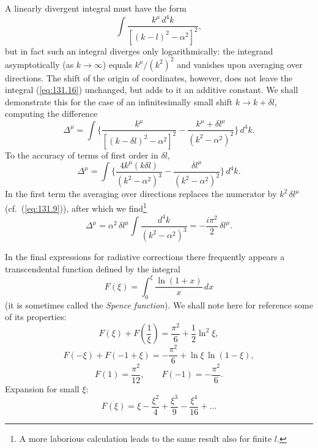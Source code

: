 A linearly divergent integral must have the form
\begin{equation}
\int \frac{k^\mu\,d^4k}{[(k-l)^2 - \alpha^2]^2},
\label{eq:131.16}
\end{equation}
but in fact such an integral diverges only logarithmically: the integrand asymptotically (as $k \to \infty$) equals $k^\mu/(k^2)^2$ and vanishes upon averaging over directions. The shift of the origin of coordinates, however, does not leave the integral (\ref{eq:131.16}) unchanged, but adds to it an additive constant. We shall demonstrate this for the case of an infinitesimally small shift $k \to k + \delta l$, computing the difference
\begin{equation}
\Delta^\mu = \int \biggl\{\frac{k^\mu}{[(k - \delta l)^2 - \alpha^2]^2} - \frac{k^\mu + \delta l^\mu}{(k^2 - \alpha^2)^2}\biggr\}\,d^4k.
\label{eq:131.17}
\end{equation}
To the accuracy of terms of first order in $\delta l$,
\[
\Delta^\mu = \int \biggl\{\frac{4k^\mu(k\delta l)}{(k^2 - \alpha^2)^3} - \frac{\delta l^\mu}{(k^2 - \alpha^2)^2}\biggr\}\,d^4k.
\]
In the first term the averaging over directions replaces the numerator by $k^2\,\delta l^\mu$ (cf.\ (\ref{eq:131.9})), after which we find\footnote{A more laborious calculation leads to the same result also for finite $l$.}
\begin{equation}
\Delta^\mu = \alpha^2\,\delta l^\mu \int \frac{d^4k}{(k^2 - \alpha^2)^3} = -\frac{i\pi^2}{2}\,\delta l^\mu.
\label{eq:131.18}
\end{equation}


In the final expressions for radiative corrections there frequently appears a transcendental function defined by the integral
\begin{equation}
F(\xi) = \int_0^\xi \frac{\ln(1+x)}{x}\,dx
\label{eq:131.19}
\end{equation}
(it is sometimes called the \emph{Spence function}). We shall note here for reference some of its properties:
\begin{equation}
F(\xi) + F\!\left(\frac{1}{\xi}\right) = \frac{\pi^2}{6} + \frac{1}{2}\ln^2\xi,
\label{eq:131.20}
\end{equation}
\begin{equation}
F(-\xi) + F(-1+\xi) = -\frac{\pi^2}{6} + \ln\xi\,\ln(1 - \xi),
\label{eq:131.21}
\end{equation}
\begin{equation}
F(1) = \frac{\pi^2}{12}, \qquad F(-1) = -\frac{\pi^2}{6}.
\label{eq:131.22}
\end{equation}
Expansion for small $\xi$:
\begin{equation}
F(\xi) = \xi - \frac{\xi^2}{4} + \frac{\xi^3}{9} - \frac{\xi^4}{16} + \ldots
\label{eq:131.23}
\end{equation}
